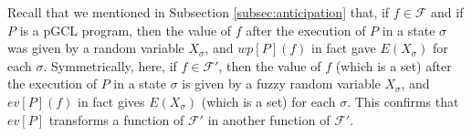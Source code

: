 \documentclass[a4paper,10pt]{llncs}
\def\RRposi {{\mathbb R_{\geq 0}^{\infty}}}
\begin{document}
Recall that we mentioned in Subsection \ref{subsec:anticipation} that, if $f \in \mathcal{F}$ and if $P$ is a pGCL program, then the value of $f$ after the execution of $P$ in a state $\sigma$ was given by a random variable $X_\sigma$, and $wp[P](f)$ in fact gave $E(X_\sigma)$ for each $\sigma$.\newline
Symmetrically, here, if $f \in \mathcal{F}'$, then the value of $f$ (which is a set) after the execution of $P$ in a state $\sigma$ is given by a fuzzy random variable $X_\sigma$, and $ev[P](f)$ in fact gives $E(X_\sigma)$ (which is a set) for each $\sigma$. This confirms that $ev[P]$ transforms a function of $\mathcal{F}'$ in another function of $\mathcal{F}'$.\newline
\end{document}
